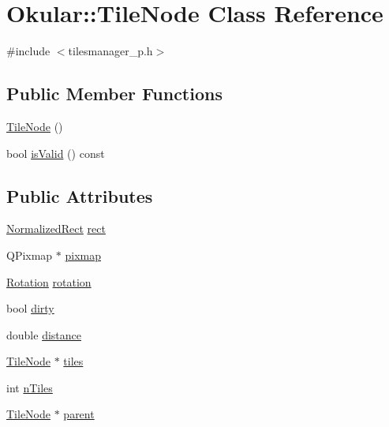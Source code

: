 \hypertarget{classOkular_1_1TileNode}{\section{Okular\+:\+:Tile\+Node Class Reference}
\label{classOkular_1_1TileNode}
}


{\ttfamily \#include $<$tilesmanager\+\_\+p.\+h$>$}

\subsection*{Public Member Functions}
\begin{DoxyCompactItemize}
\item 
\hyperlink{classOkular_1_1TileNode_a348695ff38ca8d29cbd1bb9f72206c30}{Tile\+Node} ()
\item 
bool \hyperlink{classOkular_1_1TileNode_a2e8451a76338513fc71653e763d0262f}{is\+Valid} () const 
\end{DoxyCompactItemize}
\subsection*{Public Attributes}
\begin{DoxyCompactItemize}
\item 
\hyperlink{classOkular_1_1NormalizedRect}{Normalized\+Rect} \hyperlink{classOkular_1_1TileNode_a4b576ad78dac8c1d5c68fd9961b9c038}{rect}
\item 
Q\+Pixmap $\ast$ \hyperlink{classOkular_1_1TileNode_a6f1530e7484013655499145b83debc0d}{pixmap}
\item 
\hyperlink{namespaceOkular_a8556d00465f61ef533c6b027669e7da6}{Rotation} \hyperlink{classOkular_1_1TileNode_a42e2fd93c34cc3a9bedaf23f0448e40f}{rotation}
\item 
bool \hyperlink{classOkular_1_1TileNode_a6c0d041fa9a8cadecc4ea3b2c8e55de5}{dirty}
\item 
double \hyperlink{classOkular_1_1TileNode_ae0f9bbe30de6236cc1f22a6c04c24c2f}{distance}
\item 
\hyperlink{classOkular_1_1TileNode}{Tile\+Node} $\ast$ \hyperlink{classOkular_1_1TileNode_a5b2ae780071fcc4d535e69cd50ea5f4f}{tiles}
\item 
int \hyperlink{classOkular_1_1TileNode_ab5af51178fe629bbee781d656671eaf5}{n\+Tiles}
\item 
\hyperlink{classOkular_1_1TileNode}{Tile\+Node} $\ast$ \hyperlink{classOkular_1_1TileNode_ade947c75baa62dd6d29fe7776f1e6027}{parent}
\end{DoxyCompactItemize}


